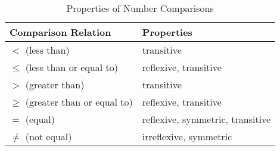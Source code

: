 \begin{table}[H]
  \centering
  \begin{tabular}{p{2in} p{3in}}
  \toprule
  \textbf{Comparison Relation} & \textbf{Properties} \\
  \midrule
  \( < \) (less than) & transitive \\
  \( \leq \) (less than or equal to) & reflexive, transitive \\
  \( > \) (greater than) & transitive \\
  \( \geq \) (greater than or equal to) & reflexive, transitive \\
  \( = \) (equal) & reflexive, symmetric, transitive \\
  \( \neq \) (not equal) & irreflexive, symmetric \\
  \bottomrule
  \end{tabular}
  \caption{Properties of Number Comparisons}
\end{table}


